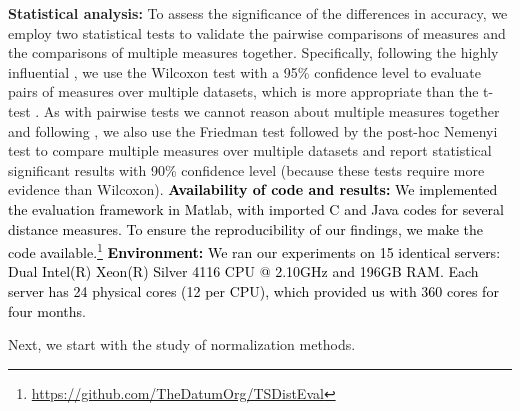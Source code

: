 \documentclass[11pt]{article}
\begin{document}
\noindent \textbf{Statistical analysis: } To assess the significance of the differences in accuracy, we employ two statistical tests to validate the pairwise comparisons of measures and the comparisons of multiple measures together. Specifically, following the highly influential \cite{demvsar2006statistical}, we use the Wilcoxon test \cite{wilcoxon1945individual} with a 95\% confidence level to evaluate pairs of measures over multiple datasets, which is more appropriate than the t-test \cite{rice2006mathematical}. As with pairwise tests we cannot reason about multiple measures together and following \cite{demvsar2006statistical}, we also use the Friedman test \cite{friedman1937use} followed by the post-hoc Nemenyi test \cite{nemenyi1963distribution} to compare multiple measures over multiple datasets and report statistical significant results with 90\% confidence level (because these tests require more evidence than Wilcoxon). 
\newline \textcolor{black}{ \textbf{Availability of code and results: } We implemented the evaluation framework in Matlab, with imported C and Java codes for several distance measures. To ensure the reproducibility of our findings, we make the code available.\footnote{\url{https://github.com/TheDatumOrg/TSDistEval}}}
\newline \textcolor{black}{ \textbf{Environment: } We ran our experiments on 15 identical servers: Dual Intel(R) Xeon(R) Silver 4116 CPU @ 2.10GHz and 196GB RAM. Each server has 24 physical cores (12 per CPU), which provided us with 360 cores for four months}. 

Next, we start with the study of normalization methods.
\end{document}
